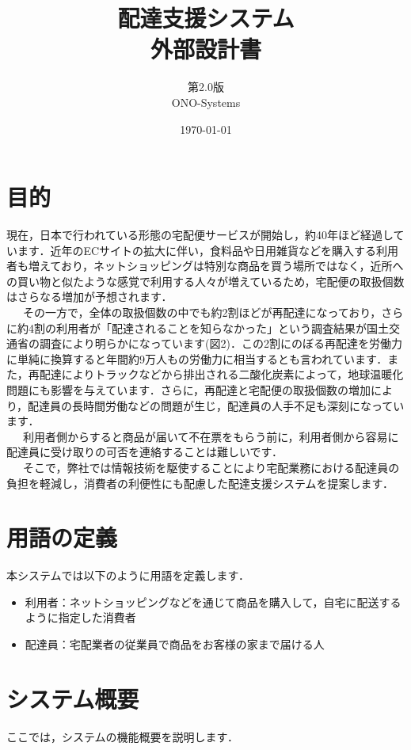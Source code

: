\documentclass[a4j,titlepage]{jarticle}
\title{\huge 配達支援システム\\
		外部設計書}
\author{第2.0版\\
        ONO-Systems\\}
\date{\today}
\begin{document}
\maketitle

\tableofcontents
\clearpage

\section{目的}
現在，日本で行われている形態の宅配便サービスが開始し，約40年ほど経過しています．近年のECサイトの拡大に伴い，食料品や日用雑貨などを購入する利用者も増えており，ネットショッピングは特別な商品を買う場所ではなく，近所への買い物と似たような感覚で利用する人々が増えているため，宅配便の取扱個数はさらなる増加が予想されます\cite{ref1}．\\
\ \ \ その一方で，全体の取扱個数の中でも約2割ほどが再配達になっており，さらに約4割の利用者が「配達されることを知らなかった」という調査結果が国土交通省の調査により明らかになっています(図2)．この2割にのぼる再配達を労働力に単純に換算すると年間約9万人もの労働力に相当するとも言われています．また，再配達によりトラックなどから排出される二酸化炭素によって，地球温暖化問題にも影響を与えています．さらに，再配達と宅配便の取扱個数の増加により，配達員の長時間労働などの問題が生じ，配達員の人手不足も深刻になっています\cite{ref1}．\\
\ \ \ 利用者側からすると商品が届いて不在票をもらう前に，利用者側から容易に配達員に受け取りの可否を連絡することは難しいです．\\
\ \ \ そこで，弊社では情報技術を駆使することにより宅配業務における配達員の負担を軽減し，消費者の利便性にも配慮した配達支援システムを提案します．

\section{用語の定義}
本システムでは以下のように用語を定義します．
\begin{itemize}
 \item 利用者：ネットショッピングなどを通じて商品を購入して，自宅に配送するように指定した消費者
 \item 配達員：宅配業者の従業員で商品をお客様の家まで届ける人
\end{itemize}

\section{システム概要}
ここでは，システムの機能概要を説明します．
\end{document}
